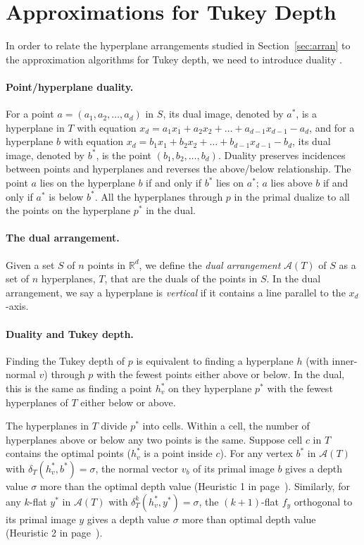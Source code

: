 \documentclass [letterpaper] {article}
\begin{document}
\section{Approximations for Tukey Depth}
\label{sec:approx}

In order to relate the hyperplane arrangements studied in Section~\ref{sec:arran} to the approximation algorithms for Tukey depth, we need to introduce duality \cite{Edel87}. 

\paragraph{Point/hyperplane duality.}
For a point $a = (a_{1}, a_{2}, \ldots, a_{d})$ in $S$, its dual image, denoted by $a^{*}$, is a hyperplane in $T$ with equation $x_{d} = a_{1}x_{1} + a_{2}x_{2} + \ldots + a_{d-1}x_{d-1} - a_{d}$, and for a hyperplane $b$ with equation $x_{d} = b_{1}x_{1} + b_{2}x_{2} + \ldots + b_{d-1}x_{d-1} - b_{d}$, its dual image, denoted by $b^{*}$, is the point $(b_{1}, b_{2}, \ldots, b_{d})$. 
Duality preserves incidences between points and hyperplanes and reverses the above/below relationship.  The point $a$ lies on the hyperplane $b$ if and only if $b^{*}$ lies on $a^{*}$; $a$ lies above $b$ if and only if $a^{*}$ is below $b^{*}$. All the hyperplanes through $p$ in the primal dualize to all the points on the hyperplane $p^{*}$ in the dual.

\paragraph{The dual arrangement.}
Given a set $S$ of $n$ points in $\mathbb{R}^{d}$, we define the \emph{dual arrangement} $\mathcal{A}(T)$ of $S$ as a set of $n$ hyperplanes, $T$, that are the duals of the points in $S$.
In the dual arrangement, we say a hyperplane is \emph{vertical} if it contains a line parallel to the $x_{d}$-axis.

\paragraph{Duality and Tukey depth.}
Finding the Tukey depth of $p$ is equivalent to finding a hyperplane $h$ (with inner-normal $v$) through $p$ with the fewest points either above or below. In the dual, this is the same as finding a point $h_{v}^{*}$ on they hyperplane $p^{*}$ with the fewest hyperplanes of $T$ either below or above. 

The hyperplanes in $T$ divide $p^{*}$ into cells. Within a cell,
the number of hyperplanes above or below any two points is the same.
Suppose cell $c$ in $T$ contains the optimal points ($h_{v}^{*}$ is
a point inside $c$). For any vertex $b^{*}$ in $\mathcal{A}(T)$ with
$\delta_{T}(h_{v}^{*},b^{*}) = \sigma$, the normal vector $v_{b}$ of its
primal image $b$ gives a depth value $\sigma$ more than the optimal depth
value (Heuristic 1 in page~\pageref{page:heuristic1}). Similarly, for any
$k$-flat $y^{*}$ in $\mathcal{A}(T)$ with $\delta_{T}^{k}(h_{v}^{*},y^{*})
= \sigma$, the $(k+1)$-flat $f_{y}$ orthogonal to its primal image $y$
gives a depth value $\sigma$ more than optimal depth value (Heuristic
2 in page~\pageref{page:heuristic2}).
\end{document}
